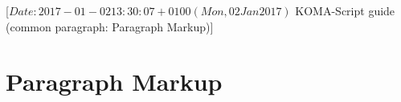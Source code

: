 %
%
%
%
%
%
%
%
% 
%
%
%
%

                 [$Date: 2017-01-02 13:30:07 +0100 (Mon, 02 Jan 2017) $
                  KOMA-Script guide (common paragraph: Paragraph Markup)]


\section{Paragraph Markup}
%
\BeginIndexGroup
{}%

